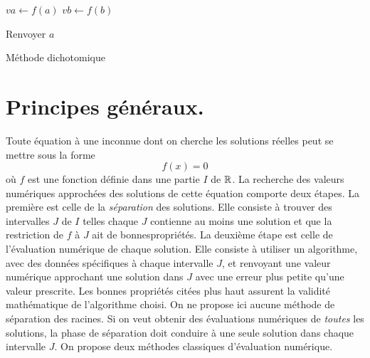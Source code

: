 

\begin{algorithm}
  $va\leftarrow f(a)$\;
  $vb\leftarrow f(b)$\;
  
  Renvoyer $a$\;
  \caption{Méthode dichotomique}
  \label{resolnumequ_1}
\end{algorithm}


\section{Principes généraux.}
Toute équation à une inconnue dont on cherche les solutions réelles peut se mettre sous la forme
\begin{displaymath}
  f(x) = 0
\end{displaymath}
où $f$ est une fonction définie dans une partie $I$ de $\mathbb{R}$. La recherche des valeurs numériques approchées des solutions de cette équation comporte deux étapes.\newline
La première est celle de la \emph{séparation} des solutions. Elle consiste à trouver des intervalles $J$ de $I$ telles chaque $J$ contienne au moins une solution et que la restriction de $f$ à $J$ ait de \og bonnes\fg  propriétés. \newline 
La deuxième étape est celle de l'évaluation numérique de chaque solution. Elle consiste à utiliser un algorithme, avec des données spécifiques à chaque intervalle $J$, et renvoyant une valeur numérique approchant une solution dans $J$ avec une erreur plus petite qu'une valeur prescrite. Les bonnes propriétés citées plus haut assurent la validité mathématique de l'algorithme choisi.\newline
On ne propose ici aucune méthode de séparation des racines. Si on veut obtenir des évaluations numériques de \emph{toutes} les solutions, la phase de séparation doit conduire à une seule solution dans chaque intervalle $J$. On propose deux méthodes classiques d'évaluation numérique.

